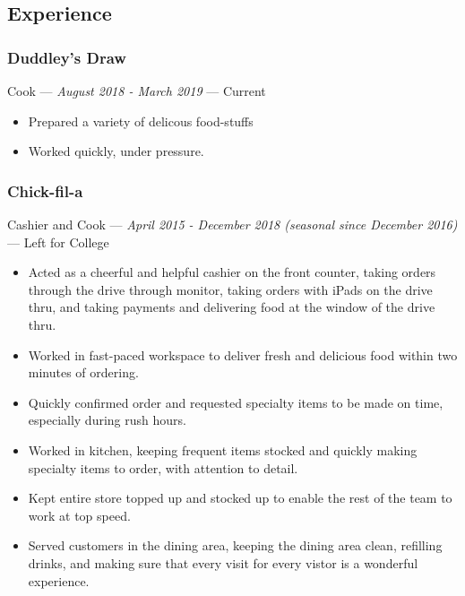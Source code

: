 \documentclass[letterpaper,10pt]{article}
\begin{document}
    \subsection{Experience}\label{subsec:experience}

    \subsubsection{Duddley's Draw}
    \hfill Cook --- \emph{August 2018 - March 2019} --- Current

    \begin{itemize}
        \tightlist{}
        \item
        Prepared a variety of delicous food-stuffs
        \item
        Worked quickly, under pressure.
    \end{itemize}


    \subsubsection{Chick-fil-a}
    \hfill Cashier and Cook --- \emph{April 2015 - December 2018 (seasonal since December 2016)} --- Left for College

    \begin{itemize}
        \tightlist{}
        \item
        Acted as a cheerful and helpful cashier on the front counter, taking orders through the drive through monitor, taking orders with iPads on the drive thru, and taking payments and delivering food at the window of the drive thru.
        \item
        Worked in fast-paced workspace to deliver fresh and delicious food within two minutes of ordering.
        \item
        Quickly confirmed order and requested specialty items to be made on time, especially during rush hours.
        \item
        Worked in kitchen, keeping frequent items stocked and quickly making specialty items to order, with attention to detail.
        \item
        Kept entire store topped up and stocked up to enable the rest of the team to work at top speed.
        \item
        Served customers in the dining area, keeping the dining area clean, refilling drinks, and making sure that every visit for every vistor is a wonderful experience.
    \end{itemize}
\end{document}
